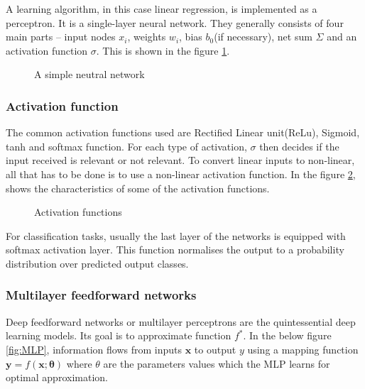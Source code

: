 A learning algorithm, in this case linear regression, is implemented as a perceptron. It
is a single-layer neural network. They generally consists of four main parts -- input
nodes $x_i$, weights $w_i$, bias $b_0$(if necessary), net sum $\Sigma$ and an activation
function $\sigma$. This is shown in the figure \ref{fig:simpleNN}.

\begin{figure}[h]
    \centering
        \def\svgwidth{0.5\textwidth}
        
        \caption{A simple neutral network}
        \label{fig:simpleNN}
\end{figure}

\subsubsection*{Activation function}
The common activation functions used are Rectified Linear unit(ReLu), Sigmoid, tanh and
softmax function. For each type of activation, $\sigma$ then decides if the input received is
relevant or not relevant. To convert linear inputs to non-linear, all that has to be done
is to use a non-linear activation function. In the figure \ref{fig:activationfunctions},
shows the characteristics of some of the activation functions.
\begin{figure}[ht]
	\begin{center}
   \def\svgwidth{0.5\textwidth}
	\end{center}
    \caption{Activation functions}
    \label{fig:activationfunctions}
\end{figure}
For classification tasks, usually the last layer of the networks is equipped with softmax
activation layer. This function normalises the output to a probability distribution over
predicted output classes.

\subsubsection*{Multilayer feedforward networks}
Deep feedforward networks or multilayer perceptrons are the quintessential deep learning
models. Its goal is to approximate function $f^*$. In the below figure \ref{fig:MLP},
information flows from inputs $\mathbf{x}$ to output $y$ using a mapping function
$\mathbf{y} = f(\mathbf{x};\mathbf{\theta})$ where $\theta$ are the parameters values
which the MLP learns for optimal approximation.

